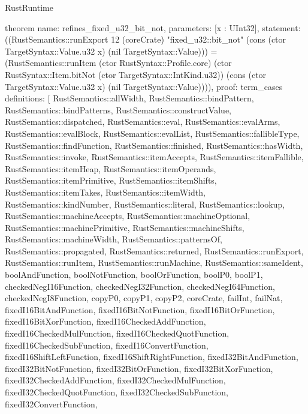 \begin{lexlean}{RustRuntime}
\begin{semanticmodule}
theorem{
  name: refines_fixed_u32_bit_not,
  parameters: [x : UInt32],
  statement: ((RustSemantics::runExport 12 (coreCrate) "fixed_u32::bit_not" (cons (ctor TargetSyntax::Value.u32 x) (nil TargetSyntax::Value))) = (RustSemantics::runItem (ctor RustSyntax::Profile.core) (ctor RustSyntax::Item.bitNot (ctor TargetSyntax::IntKind.u32)) (cons (ctor TargetSyntax::Value.u32 x) (nil TargetSyntax::Value)))),
  proof: term_cases{
    definitions: [
      RustSemantics::allWidth,
      RustSemantics::bindPattern,
      RustSemantics::bindPatterns,
      RustSemantics::constructValue,
      RustSemantics::dispatched,
      RustSemantics::eval,
      RustSemantics::evalArms,
      RustSemantics::evalBlock,
      RustSemantics::evalList,
      RustSemantics::fallibleType,
      RustSemantics::findFunction,
      RustSemantics::finished,
      RustSemantics::hasWidth,
      RustSemantics::invoke,
      RustSemantics::itemAccepts,
      RustSemantics::itemFallible,
      RustSemantics::itemHeap,
      RustSemantics::itemOperands,
      RustSemantics::itemPrimitive,
      RustSemantics::itemShifts,
      RustSemantics::itemTakes,
      RustSemantics::itemWidth,
      RustSemantics::kindNumber,
      RustSemantics::literal,
      RustSemantics::lookup,
      RustSemantics::machineAccepts,
      RustSemantics::machineOptional,
      RustSemantics::machinePrimitive,
      RustSemantics::machineShifts,
      RustSemantics::machineWidth,
      RustSemantics::patternsOf,
      RustSemantics::propagated,
      RustSemantics::returned,
      RustSemantics::runExport,
      RustSemantics::runItem,
      RustSemantics::runMachine,
      RustSemantics::sameIdent,
      boolAndFunction,
      boolNotFunction,
      boolOrFunction,
      boolP0,
      boolP1,
      checkedNegI16Function,
      checkedNegI32Function,
      checkedNegI64Function,
      checkedNegI8Function,
      copyP0,
      copyP1,
      copyP2,
      coreCrate,
      failInt,
      failNat,
      fixedI16BitAndFunction,
      fixedI16BitNotFunction,
      fixedI16BitOrFunction,
      fixedI16BitXorFunction,
      fixedI16CheckedAddFunction,
      fixedI16CheckedMulFunction,
      fixedI16CheckedQuotFunction,
      fixedI16CheckedSubFunction,
      fixedI16ConvertFunction,
      fixedI16ShiftLeftFunction,
      fixedI16ShiftRightFunction,
      fixedI32BitAndFunction,
      fixedI32BitNotFunction,
      fixedI32BitOrFunction,
      fixedI32BitXorFunction,
      fixedI32CheckedAddFunction,
      fixedI32CheckedMulFunction,
      fixedI32CheckedQuotFunction,
      fixedI32CheckedSubFunction,
      fixedI32ConvertFunction,
}}
\end{semanticmodule}
\end{lexlean}
